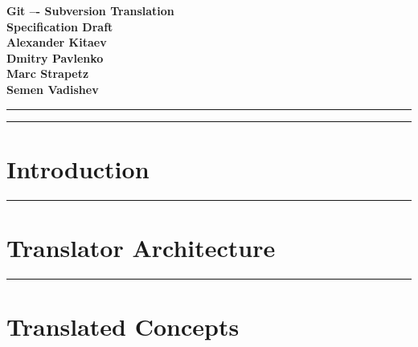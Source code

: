 \documentclass[aps,%
12pt,%
final,%
oneside,
onecolumn,%
superscriptaddress,%
centertags]{article} %
\begin{document}
\begin{titlepage}
\begin{center}

\textbf{\LARGE Git –- Subversion Translation} \\[2.0cm]
\textbf{\LARGE Specification Draft} \\[3.0cm]

\textbf{Alexander Kitaev} \\[0.7cm]
\textbf{Dmitry Pavlenko} \\[0.7cm]
\textbf{Marc Strapetz} \\[0.7cm]
\textbf{Semen Vadishev} \\[0.7cm]

\end{center}
\end{titlepage}

\topmargin=-10pt
\setcounter{page}{2}

\newpage
\hrule
\tableofcontents

\newpage
\hrule
\section{Introduction}


\newpage
\hrule
\section{Translator Architecture}






\newpage
\hrule
\section{Translated Concepts}






\end{document}
